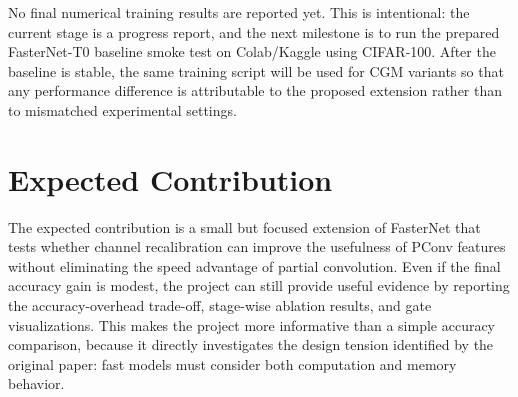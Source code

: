 \documentclass{article}
\begin{document}
No final numerical training results are reported yet. This is intentional: the current stage is a progress report, and the next milestone is to run the prepared FasterNet-T0 baseline smoke test on Colab/Kaggle using CIFAR-100. After the baseline is stable, the same training script will be used for CGM variants so that any performance difference is attributable to the proposed extension rather than to mismatched experimental settings.

\section{Expected Contribution}

The expected contribution is a small but focused extension of FasterNet that tests whether channel recalibration can improve the usefulness of PConv features without eliminating the speed advantage of partial convolution. Even if the final accuracy gain is modest, the project can still provide useful evidence by reporting the accuracy-overhead trade-off, stage-wise ablation results, and gate visualizations. This makes the project more informative than a simple accuracy comparison, because it directly investigates the design tension identified by the original paper: fast models must consider both computation and memory behavior.



\end{document}
